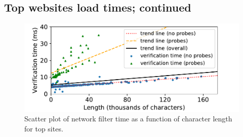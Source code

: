 

\subsection{Top websites load times; continued} \label{top_sites}

\begin{figure}[h]
	\includegraphics[scale=0.5]{results/string_length_vs_verification_time_small.pdf}
	\caption{Scatter plot of network filter time as a function of character length for top sites.}
	\label{fig:verification_time_string_length}
\end{figure}

